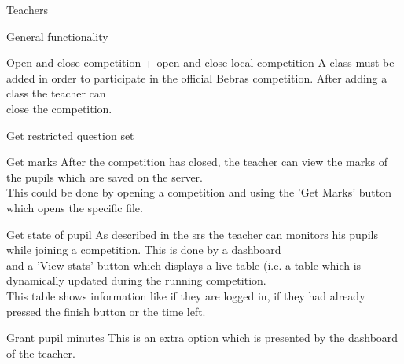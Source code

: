 \begin{section}{Teachers}
\begin{subsection}{General functionality}
\begin{subsubsection}{Open and close competition + open and close local competition}
	A class must be added in order to participate in the official Bebras competition. After adding a class the teacher can\\
	close the competition. 
	\end{subsubsection}
	\begin{subsubsection}{Get restricted question set}
	\end{subsubsection}
	\begin{subsubsection}{Get marks}
	After the competition has closed, the teacher can view the marks of the pupils which are saved on the server.\\
	This could be done by opening a competition and using the 'Get Marks' button which opens the specific file.
	\end{subsubsection}
	\begin{subsubsection}{Get state of pupil}
	As described in the srs the teacher can monitors his pupils while joining a competition. This is done by a dashboard\\
	and a 'View stats' button which displays a live table (i.e. a table which is dynamically updated during the running competition.\\
	This table shows information like if they are logged in, if they had already pressed the finish button or the time left.
	\end{subsubsection}
	\begin{subsubsection}{Grant pupil minutes}
	This is an extra option which is presented by the dashboard of the teacher. 
    \end{subsubsection}
    \end{subsection}

\end{section}
